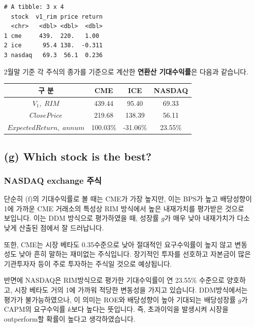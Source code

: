 \documentclass[
  letterpaper,
  DIV=11,
  numbers=noendperiod]{scrreprt}
\begin{document}
\begin{verbatim}
# A tibble: 3 x 4
  stock  v1_rim price return
  <chr>   <dbl> <dbl>  <dbl>
1 cme     439.  220.   1.00 
2 ice      95.4 138.  -0.311
3 nasdaq   69.3  56.1  0.236
\end{verbatim}

2월말 기준 각 주식의 종가를 기준으로 계산한 \textbf{연환산 기대수익률}은
다음과 같습니다.

\begin{longtable}[]{@{}cccc@{}}
\toprule\noalign{}
구 분 & CME & ICE & NASDAQ \\
\midrule\noalign{}
\endhead
\bottomrule\noalign{}
\endlastfoot
\(V_1,\; RIM\) & 439.44 & 95.40 & 69.33 \\
\(Close Price\) & 219.68 & 138.39 & 56.11 \\
\textbf{\(Expected Return,\; annum\)} & 100.03\% & -31.06\% & 23.55\% \\
\end{longtable}

\subsection*{(g) Which stock is the
best?}\label{g-which-stock-is-the-best}

\subsubsection*{\texorpdfstring{\textbf{NASDAQ exchange
주식}}{NASDAQ exchange 주식}}\label{nasdaq-exchange-uxc8fcuxc2dd}

단순히 (f)의 기대수익률로 볼 때는 CME가 가장 높지만, 이는 BPS가 높고
배당성향이 1에 가까운 CME 거래소의 특성상 RIM 방식에서 높은 내재가치를
평가받은 것으로 보입니다. 이는 DDM 방식으로 평가하였을 때, 성장률
\(g\)가 매우 낮아 내재가치가 다소 낮게 산출된 점에서 잘 드러납니다.

또한, CME는 시장 베타도 0.35수준으로 낮아 절대적인 요구수익률이 높지
않고 변동성도 낮아 흔히 말하는 재미없는 주식입니다. 장기적인 투자를
선호하고 자본금이 많은 기관투자자 등이 주로 투자하는 주식일 것으로
예상됩니다.

반면에 NASDAQ은 RIM방식으로 평가한 기대수익률이 연 23.55\% 수준으로
양호하고, 시장 베타도 거의 1에 가까워 적당한 변동성을 가지고 있습니다.
DDM방식에서는 평가가 불가능하였으나, 이 의미는 ROE와 배당성향이 높아
기대되는 배당성장률 \(g\)가 CAPM의 요구수익률 \(k\)보다 높다는 뜻입니다.
즉, 초과이익을 발생시켜 시장을 outperform할 확률이 높다고
생각하였습니다.
\end{document}
